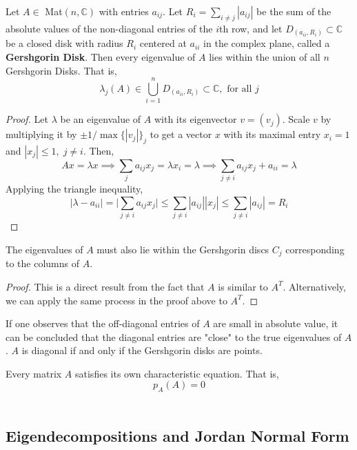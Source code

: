   \begin{theorem}
  Let $A \in $ Mat$(n, \mathbb{C})$ with entries $a_{i j}$. Let $R_i = \sum_{i \neq j} |a_{i j}|$ be the sum of the absolute values of the non-diagonal entries of the $i$th row, and let $D_(a_{i i}, R_i) \subset \mathbb{C}$ be a closed disk with radius $R_i$ centered at $a_{i i}$ in the complex plane, called a \textbf{Gershgorin Disk}. Then every eigenvalue of $A$ lies within the union of all $n$ Gershgorin Disks. That is, 
  \[ \lambda_j (A) \in \bigcup_{i= 1}^{n} D_(a_{i i}, R_i) \subset \mathbb{C}, \text{ for all } j\]
  \end{theorem}

  \begin{proof}
  Let $\lambda$ be an eigenvalue of $A$ with its eigenvector $v = (v_j)$. Scale $v$ by multiplying it by $ \pm 1 / \max{\{|v_j|\}_j}$ to get a vector $x$ with its maximal entry $x_i = 1$ and $|x_j| \leq 1, \; j \neq i$. Then, 
  \[A x = \lambda x \implies \sum_{j} a_{i j} x_j = \lambda x_i = \lambda \implies \sum_{j \neq i} a_{i j} x_j + a_{i i} = \lambda\]
  Applying the triangle inequality, 
  \[| \lambda - a_{i i} | = \bigg| \sum_{j \neq i} a_{i j} x_j\bigg| \leq \sum_{j \neq i} |a_{i j}| |x_j| \leq \sum_{j \neq i} |a_{i j}| = R_i\]
  \end{proof}

  \begin{corollary}
  The eigenvalues of $A$ must also lie within the Gershgorin discs $C_j$ corresponding to the columns of $A$. 
  \end{corollary}

  \begin{proof}
  This is a direct result from the fact that $A$ is similar to $A^T$. Alternatively, we can apply the same process in the proof above to $A^T$.
  \end{proof} 

  If one observes that the off-diagonal entries of $A$ are small in absolute value, it can be concluded that the diagonal entries are "close" to the true eigenvalues of $A$. $A$ is diagonal if and only if the Gershgorin disks are points. 

  \begin{theorem}
  Every matrix $A$ satisfies its own characteristic equation. That is, 
  \[ p_{A}(A) = 0\]\
  \end{theorem} 

\subsection{Eigendecompositions and Jordan Normal Form}

